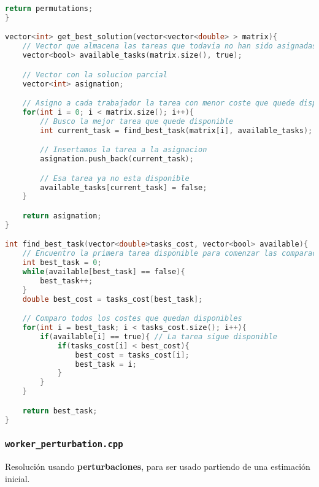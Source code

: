 \documentclass[10pt, a4paper]{article}
\theoremstyle{theorem-style}
\theoremstyle{theorem-style}
\theoremstyle{definition-style}
\theoremstyle{remark-style}
\theoremstyle{example-style}
\theoremstyle{definition-style}
\theoremstyle{remark-style}
\begin{document}
\begin{lstlisting}[language=C]
    return permutations;
}

vector<int> get_best_solution(vector<vector<double> > matrix){
    // Vector que almacena las tareas que todavia no han sido asignadas
    vector<bool> available_tasks(matrix.size(), true);

    // Vector con la solucion parcial
    vector<int> asignation;

    // Asigno a cada trabajador la tarea con menor coste que quede disponible
    for(int i = 0; i < matrix.size(); i++){
        // Busco la mejor tarea que quede disponible
        int current_task = find_best_task(matrix[i], available_tasks);

        // Insertamos la tarea a la asignacion
        asignation.push_back(current_task);

        // Esa tarea ya no esta disponible
        available_tasks[current_task] = false;
    }

    return asignation;
}

int find_best_task(vector<double>tasks_cost, vector<bool> available){
    // Encuentro la primera tarea disponible para comenzar las comparaciones
    int best_task = 0;
    while(available[best_task] == false){
        best_task++;
    }
    double best_cost = tasks_cost[best_task];

    // Comparo todos los costes que quedan disponibles
    for(int i = best_task; i < tasks_cost.size(); i++){
        if(available[i] == true){ // La tarea sigue disponible
            if(tasks_cost[i] < best_cost){
                best_cost = tasks_cost[i];
                best_task = i;
            }
        }
    }

    return best_task;
}
\end{lstlisting}

\subsubsection*{\texttt{worker\_perturbation.cpp}}

Resolución usando \textbf{perturbaciones}, para ser usado partiendo de una estimación inicial.
\end{document}
